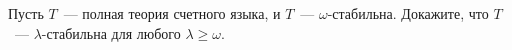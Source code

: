 Пусть $T$~--- полная теория счетного языка, и $T$~--- $\omega$-стабильна. Докажите, что $T$~---
$\lambda$-стабильна для любого $\lambda \ge \omega$.
